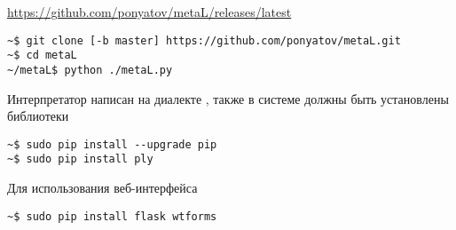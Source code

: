 \label{install}

\url{https://github.com/ponyatov/metaL/releases/latest}

\begin{verbatim}
~$ git clone [-b master] https://github.com/ponyatov/metaL.git
~$ cd metaL
~/metaL$ python ./metaL.py
\end{verbatim}

Интерпретатор написан на диалекте , также в системе должны быть установлены
библиотеки

\begin{verbatim}
~$ sudo pip install --upgrade pip
~$ sudo pip install ply
\end{verbatim}

Для использования веб-интерфейса

\begin{verbatim}
~$ sudo pip install flask wtforms
\end{verbatim}

